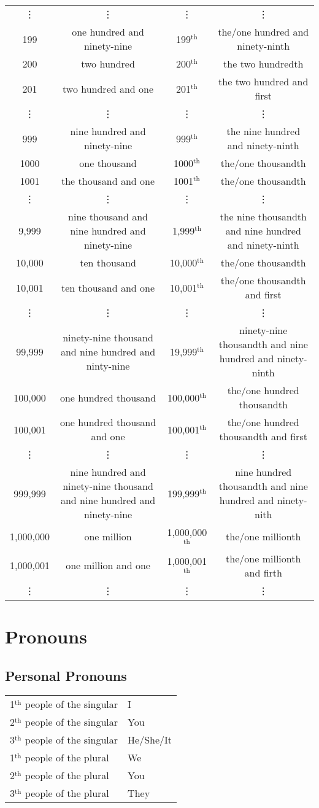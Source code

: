 \documentclass[a4paper, titlepage]{article}
\begin{document}
\begin{tabular}{cccc}
\vdots&\vdots&\vdots&\vdots\\
199&one hundred and ninety-nine&199$^{\text{th}}$&the/one hundred and ninety-ninth\\
200&two hundred&200$^{\text{th}}$&the two hundredth\\
201&two hundred and one&201$^{\text{th}}$&the two hundred and first\\
\vdots&\vdots&\vdots&\vdots\\
999&nine hundred and ninety-nine&999$^{\text{th}}$&the nine hundred and ninety-ninth\\
1000&one thousand&1000$^{\text{th}}$&the/one thousandth\\
1001&the thousand and  one&1001$^{\text{th}}$&the/one thousandth\\
\vdots&\vdots&\vdots&\vdots\\
9,999&nine thousand and nine hundred and ninety-nine&1,999$^{\text{th}}$&the nine thousandth and nine hundred and ninety-ninth\\
10,000&ten thousand&10,000$^{\text{th}}$&the/one thousandth\\
10,001&ten thousand and one&10,001$^{\text{th}}$&the/one thousandth and first\\
\vdots&\vdots&\vdots&\vdots\\
99,999&ninety-nine thousand and nine hundred and ninty-nine&19,999$^{\text{th}}$&ninety-nine thousandth and nine hundred and ninety-ninth\\
100,000&one hundred thousand&100,000$^{\text{th}}$&the/one hundred thousandth\\
100,001&one hundred thousand and one&100,001$^{\text{th}}$&the/one hundred thousandth and first\\
\vdots&\vdots&\vdots&\vdots\\
999,999&nine hundred and ninety-nine thousand and nine hundred and ninety-nine&199,999$^{\text{th}}$&nine hundred thousandth and nine hundred and ninety-nith\\
1,000,000&one million&1,000,000$^{\text{th}}$&the/one millionth\\
1,000,001&one million and one&1,000,001$^{\text{th}}$&the/one millionth and firth\\
\vdots&\vdots&\vdots&\vdots
\end{tabular}
\section{Pronouns}
\subsection{Personal Pronouns}
\begin{tabular}{ll}
1$^{\text{th}}$ people of the singular& I\\
2$^{\text{th}}$ people of the singular& You\\
3$^{\text{th}}$ people of the singular& He/She/It\\
1$^{\text{th}}$ people of the plural& We\\
2$^{\text{th}}$ people of the plural& You\\
3$^{\text{th}}$ people of the plural& They
\end{tabular}
\end{document}
